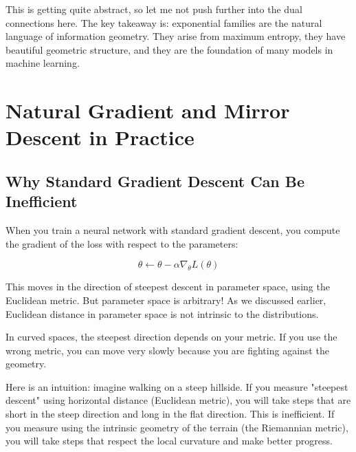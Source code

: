 \vspace{1.5em}

This is getting quite abstract, so let me not push further into the dual connections here. The key takeaway is: exponential families are the natural language of information geometry. They arise from maximum entropy, they have beautiful geometric structure, and they are the foundation of many models in machine learning.

\vspace{2em}

\section{Natural Gradient and Mirror Descent in Practice}

\subsection{Why Standard Gradient Descent Can Be Inefficient}

When you train a neural network with standard gradient descent, you compute the gradient of the loss with respect to the parameters:

\begin{equation}
\theta \leftarrow \theta - \alpha \nabla_\theta L(\theta)
\end{equation}

This moves in the direction of steepest descent in parameter space, using the Euclidean metric. But parameter space is arbitrary! As we discussed earlier, Euclidean distance in parameter space is not intrinsic to the distributions.

\vspace{1em}

In curved spaces, the steepest direction depends on your metric. If you use the wrong metric, you can move very slowly because you are fighting against the geometry.

Here is an intuition: imagine walking on a steep hillside. If you measure "steepest descent" using horizontal distance (Euclidean metric), you will take steps that are short in the steep direction and long in the flat direction. This is inefficient. If you measure using the intrinsic geometry of the terrain (the Riemannian metric), you will take steps that respect the local curvature and make better progress.

\vspace{1.5em}


